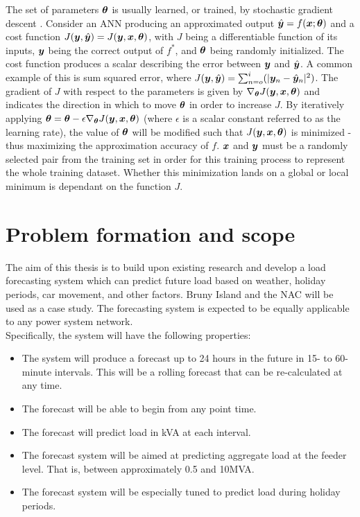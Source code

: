 \par
The set of parameters ${\bm{\theta}}$ is usually learned, or trained, by stochastic gradient descent \citep{Bottou2011}.
Consider an ANN producing an approximated output $\hat{{\bm{y}}} = f({\bm{x}}; {\bm{\theta}})$ and a cost function $J({\bm{y}}, \hat{{\bm{y}}}) = J({\bm{y}}, {\bm{x}}, {\bm{\theta}})$, with  $J$ being a differentiable function of its inputs, ${\bm{y}}$ being the correct output of $f^*$, and ${\bm{\theta}}$ being randomly initialized.
The cost function produces a scalar describing the error between ${\bm{y}}$ and $\hat{{\bm{y}}}$.
A common example of this is sum squared error, where $J({\bm{y}}, \hat{{\bm{y}}}) = \sum_{n=o}^{i}(|{\bm{y}}_n - \hat{{\bm{y}}}_n|^2)$.
The gradient of $J$ with respect to the parameters is given by $\nabla_{{\bm{\theta}}}J({\bm{y}}, {\bm{x}}, {\bm{\theta}})$ and indicates the direction in which to move ${\bm{\theta}}$ in order to increase $J$.
By iteratively applying ${\bm{\theta}} = {\bm{\theta}} - \epsilon \nabla_{{\bm{\theta}}}J({\bm{y}}, {\bm{x}}, {\bm{\theta}})$ (where $\epsilon$ is a scalar constant referred to as the learning rate), the value of ${\bm{\theta}}$ will be modified such that $J({\bm{y}}, {\bm{x}}, {\bm{\theta}})$ is minimized - thus maximizing the approximation accuracy of $f$.
${\bm{x}}$ and ${\bm{y}}$ must be a randomly selected pair from the training set in order for this training process to represent the whole training dataset.
Whether this minimization lands on a global or local minimum is dependant on the function $J$.
\par


\section{Problem formation and scope}
\label{scope}
The aim of this thesis is to build upon existing research and develop a load forecasting system which can predict future load based on weather, holiday periods, car movement, and other factors. 
Bruny Island and the NAC will be used as a case study. 
The forecasting system is expected to be equally applicable to any power system network.
\\
Specifically, the system will have the following properties:
\begin{itemize}
	\item The system will produce a forecast up to 24 hours in the future in 15- to 60-minute intervals. This will be a rolling forecast that can be re-calculated at any time.
	\item The forecast will be able to begin from any point time.
	\item The forecast will predict load in kVA at each interval.
	\item The forecast system will be aimed at predicting aggregate load at the feeder level. That is, between approximately 0.5 and 10MVA.
	\item The forecast system will be especially tuned to predict load during holiday periods.
\end{itemize}
